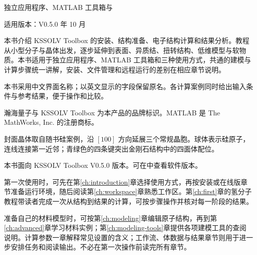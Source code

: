 \thispagestyle{plain}

\vspace{5mm}
\noindent 独立应用程序、MATLAB\regmark{} 工具箱与\ksonline{}\par
\noindent 适用版本：V0.5.0 年 10 月

\vspace{7mm}
本书介绍 KSSOLV Toolbox 的安装、结构准备、电子结构计算和结果分析。教程从小型分子与晶体出发，逐步延伸到表面、异质结、扭转结构、低维模型与软物质。本书适用于独立应用程序、MATLAB\regmark{} 工具箱和\ksonline{}三种使用方式，共通的建模与计算步骤统一讲解，安装、文件管理和远程运行的差别在相应章节说明。

本书采用中文界面名称；以英文显示的字段保留原名。各计算案例同时给出输入条件与参考结果，便于操作和比较。

\vspace{\baselineskip}

瀚海量子\regmark{}与 KSSOLV Toolbox 为本产品的品牌标识。MATLAB\regmark{} 是 The MathWorks, Inc. 的注册商标。

\vspace{\baselineskip}

封面晶体取自随书硅案例，沿 $[100]$ 方向延展三个常规晶胞。球体表示硅原子，连线连接第一近邻；青绿色的四条键突出金刚石结构中的四面体配位。

\vfill
{}
\clearpage


\vspace{4mm}

本书面向 KSSOLV Toolbox V0.5.0 版本。可在中查看软件版本。

\vspace{\baselineskip}

第一次使用时，可先在第\ref{ch:introduction}章选择使用方式，再按安装或在线版章节准备运行环境，随后阅读第\ref{ch:workspace}章熟悉工作区。第\ref{ch:first}章的氢分子教程带读者完成一次从结构到结果的计算，可按步骤操作并核对每一阶段的结果。

准备自己的材料模型时，可按第\ref{ch:modeling}章编辑原子结构，再到第\ref{ch:advanced}章学习材料实例；第\ref{ch:modeling-tools}章提供各项建模工具的查阅说明。计算参数一章解释常见设置的含义；工作流、体数据与结果章节则用于进一步安排任务和阅读输出。不必在第一次操作前读完所有章节。

